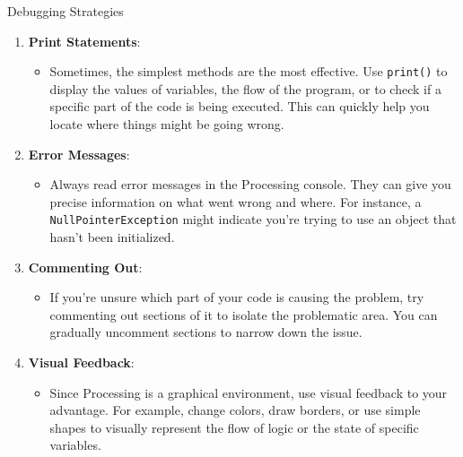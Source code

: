 \documentclass[10pt]{beamer}
\begin{document}
\begin{frame}{Debugging Strategies}
    	 \begin{enumerate}
\def\labelenumi{\arabic{enumi}.}
\item
  \textbf{Print Statements}:

  \begin{itemize}
  \item
    Sometimes, the simplest methods are the most effective. Use
    \texttt{print()} to display the values of variables, the flow of the
    program, or to check if a specific part of the code is being
    executed. This can quickly help you locate where things might be
    going wrong.
  \end{itemize}
\item
  \textbf{Error Messages}:

  \begin{itemize}
  \item
    Always read error messages in the Processing console. They can give
    you precise information on what went wrong and where. For instance,
    a \texttt{NullPointerException} might indicate you're trying to use
    an object that hasn't been initialized.
  \end{itemize}
\item
  \textbf{Commenting Out}:

  \begin{itemize}
  \item
    If you're unsure which part of your code is causing the problem, try
    commenting out sections of it to isolate the problematic area. You
    can gradually uncomment sections to narrow down the issue.
  \end{itemize}
\item
  \textbf{Visual Feedback}:

  \begin{itemize}
  \item
    Since Processing is a graphical environment, use visual feedback to
    your advantage. For example, change colors, draw borders, or use
    simple shapes to visually represent the flow of logic or the state
    of specific variables.
  \end{itemize}
\end{enumerate}
\end{frame}

\end{document}
